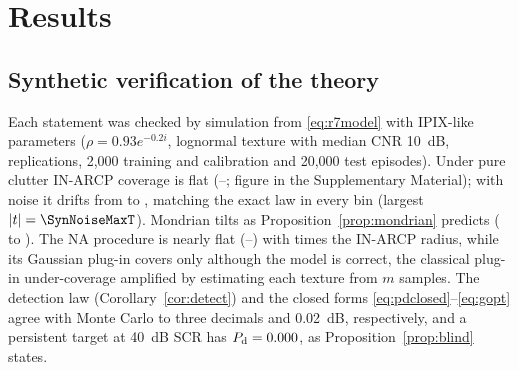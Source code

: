 \documentclass[journal]{IEEEtran}
\begin{document}
\section{Results}
\subsection{Synthetic verification of the theory}
Each statement was checked by simulation from \eqref{eq:r7model} with IPIX-like parameters ($\rho=0.93e^{-0.2i}$, lognormal texture with median CNR 10~dB, \SynReps{} replications, 2,000 training and calibration and 20,000 test episodes). Under pure clutter IN-ARCP coverage is flat (\SynSirvInLow{}--\SynSirvInHigh{}; figure in the Supplementary Material); with noise it drifts from \SynNoiseInLow{} to \SynNoiseInHigh{}, matching the exact law in every bin (largest $|t|=\SynNoiseMaxT$). Mondrian tilts as Proposition~\ref{prop:mondrian} predicts (\SynSirvMonLow{} to \SynSirvMonHigh{}). The NA procedure is nearly flat (\SynNaLow{}--\SynNaHigh{}) with \SynNaRatio{} times the IN-ARCP radius, while its Gaussian plug-in covers only \SynNaGCov{} although the model is correct, the classical plug-in under-coverage \cite{barndorff1996,vidoni2009,lawless2005} amplified by estimating each texture from $m$ samples. The detection law (Corollary~\ref{cor:detect}) and the closed forms \eqref{eq:pdclosed}--\eqref{eq:gopt} agree with Monte Carlo to three decimals and 0.02~dB, respectively, and a persistent target at 40~dB SCR has $P_{\rm d}=0.000$, as Proposition~\ref{prop:blind} states.
\end{document}
